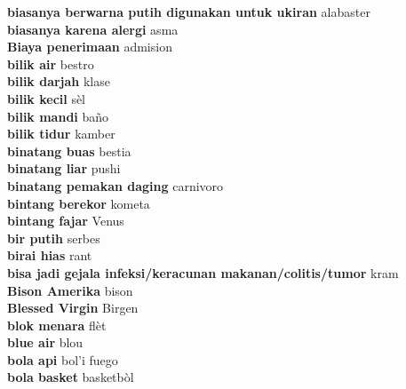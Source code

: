 \textbf{ biasanya berwarna putih digunakan untuk ukiran  } alabaster \\
\textbf{ biasanya karena alergi  } asma \\
\textbf{ Biaya penerimaan  } admision \\
\textbf{ bilik air  } bestro \\
\textbf{ bilik darjah  } klase \\
\textbf{ bilik kecil  } sèl \\
\textbf{ bilik mandi  } baño \\
\textbf{ bilik tidur  } kamber \\
\textbf{ binatang buas  } bestia \\
\textbf{ binatang liar  } pushi \\
\textbf{ binatang pemakan daging  } carnivoro \\
\textbf{ bintang berekor  } kometa \\
\textbf{ bintang fajar  } Venus \\
\textbf{ bir putih  } serbes \\
\textbf{ birai hias  } rant \\
\textbf{ bisa jadi gejala infeksi/keracunan makanan/colitis/tumor  } kram \\
\textbf{ Bison Amerika  } bison \\
\textbf{ Blessed Virgin  } Birgen \\
\textbf{ blok menara  } flèt \\
\textbf{ blue air  } blou \\
\textbf{ bola api  } bol’i fuego \\
\textbf{ bola basket  } basketbòl \\
